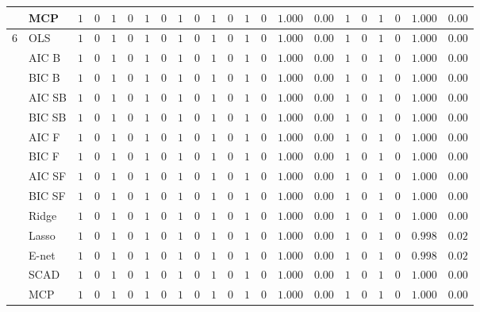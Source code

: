 \begin{tabular}{p{0.2cm}p{1cm}|p{0.6cm}p{0.6cm}|p{0.6cm}p{0.6cm}p{0.6cm}p{0.6cm}p{0.6cm}p{0.6cm}|p{0.6cm}p{0.6cm}p{0.6cm}p{0.6cm}p{0.6cm}p{0.6cm}|p{0.6cm}p{0.6cm}p{0.6cm}p{0.6cm}p{0.6cm}p{0.6cm}}
 & MCP  & $1$ & $0$ & $1$ & $0$ & $1$ & $0$ & $1$ & $0$ & $1$ & $0$ & $1$ & $0$ & $1.000$ & $0.00$ & $1$ & $0$ & $1$ & $0$ & $1.000$ & $0.00$ \\\hline
6 & OLS  & $1$ & $0$ & $1$ & $0$ & $1$ & $0$ & $1$ & $0$ & $1$ & $0$ & $1$ & $0$ & $1.000$ & $0.00$ & $1$ & $0$ & $1$ & $0$ & $1.000$ & $0.00$ \\
 & AIC B  & $1$ & $0$ & $1$ & $0$ & $1$ & $0$ & $1$ & $0$ & $1$ & $0$ & $1$ & $0$ & $1.000$ & $0.00$ & $1$ & $0$ & $1$ & $0$ & $1.000$ & $0.00$ \\
 & BIC B  & $1$ & $0$ & $1$ & $0$ & $1$ & $0$ & $1$ & $0$ & $1$ & $0$ & $1$ & $0$ & $1.000$ & $0.00$ & $1$ & $0$ & $1$ & $0$ & $1.000$ & $0.00$ \\
 & AIC SB  & $1$ & $0$ & $1$ & $0$ & $1$ & $0$ & $1$ & $0$ & $1$ & $0$ & $1$ & $0$ & $1.000$ & $0.00$ & $1$ & $0$ & $1$ & $0$ & $1.000$ & $0.00$ \\
 & BIC SB  & $1$ & $0$ & $1$ & $0$ & $1$ & $0$ & $1$ & $0$ & $1$ & $0$ & $1$ & $0$ & $1.000$ & $0.00$ & $1$ & $0$ & $1$ & $0$ & $1.000$ & $0.00$ \\
 & AIC F  & $1$ & $0$ & $1$ & $0$ & $1$ & $0$ & $1$ & $0$ & $1$ & $0$ & $1$ & $0$ & $1.000$ & $0.00$ & $1$ & $0$ & $1$ & $0$ & $1.000$ & $0.00$ \\
 & BIC F  & $1$ & $0$ & $1$ & $0$ & $1$ & $0$ & $1$ & $0$ & $1$ & $0$ & $1$ & $0$ & $1.000$ & $0.00$ & $1$ & $0$ & $1$ & $0$ & $1.000$ & $0.00$ \\
 & AIC SF  & $1$ & $0$ & $1$ & $0$ & $1$ & $0$ & $1$ & $0$ & $1$ & $0$ & $1$ & $0$ & $1.000$ & $0.00$ & $1$ & $0$ & $1$ & $0$ & $1.000$ & $0.00$ \\
 & BIC SF  & $1$ & $0$ & $1$ & $0$ & $1$ & $0$ & $1$ & $0$ & $1$ & $0$ & $1$ & $0$ & $1.000$ & $0.00$ & $1$ & $0$ & $1$ & $0$ & $1.000$ & $0.00$ \\
 & Ridge  & $1$ & $0$ & $1$ & $0$ & $1$ & $0$ & $1$ & $0$ & $1$ & $0$ & $1$ & $0$ & $1.000$ & $0.00$ & $1$ & $0$ & $1$ & $0$ & $1.000$ & $0.00$ \\
 & Lasso  & $1$ & $0$ & $1$ & $0$ & $1$ & $0$ & $1$ & $0$ & $1$ & $0$ & $1$ & $0$ & $1.000$ & $0.00$ & $1$ & $0$ & $1$ & $0$ & $0.998$ & $0.02$ \\
 & E-net  & $1$ & $0$ & $1$ & $0$ & $1$ & $0$ & $1$ & $0$ & $1$ & $0$ & $1$ & $0$ & $1.000$ & $0.00$ & $1$ & $0$ & $1$ & $0$ & $0.998$ & $0.02$ \\
 & SCAD  & $1$ & $0$ & $1$ & $0$ & $1$ & $0$ & $1$ & $0$ & $1$ & $0$ & $1$ & $0$ & $1.000$ & $0.00$ & $1$ & $0$ & $1$ & $0$ & $1.000$ & $0.00$ \\
 & MCP  & $1$ & $0$ & $1$ & $0$ & $1$ & $0$ & $1$ & $0$ & $1$ & $0$ & $1$ & $0$ & $1.000$ & $0.00$ & $1$ & $0$ & $1$ & $0$ & $1.000$ & $0.00$ \\
\hline 
\end{tabular}

